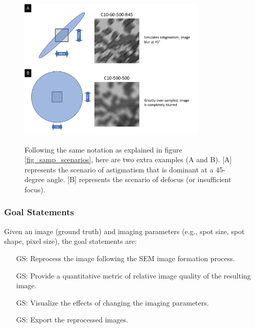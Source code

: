 \documentclass[12pt]{article}
\newcounter{goalnum} %
\begin{document}
~\newline

\begin{figure}[h!]
\begin{center}
{
 \includegraphics[width=0.8\textwidth]{figures/spot_ratio/sampling_scenarios-extra.pdf}
}
\caption{\label{fig_samp_scenarios_extra} Following the same notation as explained in figure \ref{fig_samp_scenarios}, here are two extra examples (A and B). [A] represents the scenario of astigmatism that is dominant at a 45-degree angle. [B] represents the scenario of defocus (or insufficient focus).}
\end{center}
\end{figure}

\newpage
\clearpage

\subsubsection{Goal Statements}

\noindent Given an image (ground truth) and imaging parameters (e.g., spot size, spot shape, pixel size), the goal statements are:

\begin{itemize}

\item[GS\refstepcounter{goalnum}\thegoalnum \label{G_reprocess}:] {
Reprocess the image following the SEM image formation process.
}

\item[GS\refstepcounter{goalnum}\thegoalnum \label{G_metric}:] {
Provide a quantitative metric of relative image quality of the resulting image.
}

\item[GS\refstepcounter{goalnum}\thegoalnum \label{G_visualize}:] {
Visualize the effects of changing the imaging parameters.
}

\item[GS\refstepcounter{goalnum}\thegoalnum \label{G_export}:] {
Export the reprocessed images.
}

\end{itemize}
\end{document}
